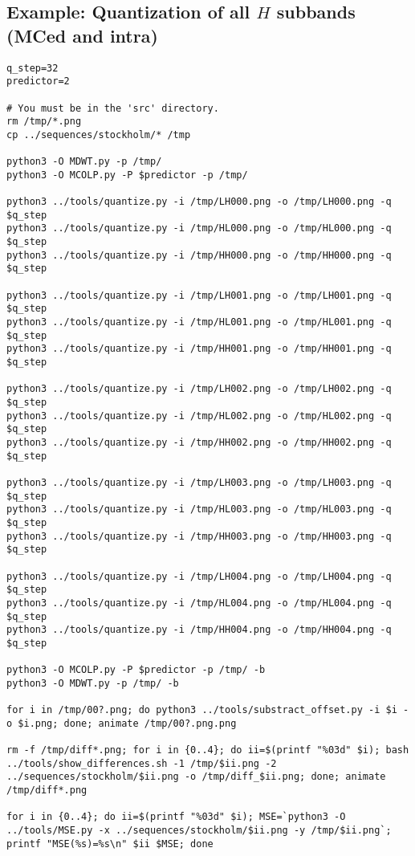 \subsection*{Example: Quantization of all $H$ subbands (MCed and intra)}
\begin{verbatim}
q_step=32
predictor=2

# You must be in the 'src' directory.
rm /tmp/*.png
cp ../sequences/stockholm/* /tmp

python3 -O MDWT.py -p /tmp/
python3 -O MCOLP.py -P $predictor -p /tmp/

python3 ../tools/quantize.py -i /tmp/LH000.png -o /tmp/LH000.png -q $q_step
python3 ../tools/quantize.py -i /tmp/HL000.png -o /tmp/HL000.png -q $q_step
python3 ../tools/quantize.py -i /tmp/HH000.png -o /tmp/HH000.png -q $q_step

python3 ../tools/quantize.py -i /tmp/LH001.png -o /tmp/LH001.png -q $q_step
python3 ../tools/quantize.py -i /tmp/HL001.png -o /tmp/HL001.png -q $q_step
python3 ../tools/quantize.py -i /tmp/HH001.png -o /tmp/HH001.png -q $q_step

python3 ../tools/quantize.py -i /tmp/LH002.png -o /tmp/LH002.png -q $q_step
python3 ../tools/quantize.py -i /tmp/HL002.png -o /tmp/HL002.png -q $q_step
python3 ../tools/quantize.py -i /tmp/HH002.png -o /tmp/HH002.png -q $q_step

python3 ../tools/quantize.py -i /tmp/LH003.png -o /tmp/LH003.png -q $q_step
python3 ../tools/quantize.py -i /tmp/HL003.png -o /tmp/HL003.png -q $q_step
python3 ../tools/quantize.py -i /tmp/HH003.png -o /tmp/HH003.png -q $q_step

python3 ../tools/quantize.py -i /tmp/LH004.png -o /tmp/LH004.png -q $q_step
python3 ../tools/quantize.py -i /tmp/HL004.png -o /tmp/HL004.png -q $q_step
python3 ../tools/quantize.py -i /tmp/HH004.png -o /tmp/HH004.png -q $q_step

python3 -O MCOLP.py -P $predictor -p /tmp/ -b
python3 -O MDWT.py -p /tmp/ -b

for i in /tmp/00?.png; do python3 ../tools/substract_offset.py -i $i -o $i.png; done; animate /tmp/00?.png.png

rm -f /tmp/diff*.png; for i in {0..4}; do ii=$(printf "%03d" $i); bash ../tools/show_differences.sh -1 /tmp/$ii.png -2 ../sequences/stockholm/$ii.png -o /tmp/diff_$ii.png; done; animate /tmp/diff*.png

for i in {0..4}; do ii=$(printf "%03d" $i); MSE=`python3 -O ../tools/MSE.py -x ../sequences/stockholm/$ii.png -y /tmp/$ii.png`; printf "MSE(%s)=%s\n" $ii $MSE; done
\end{verbatim}

